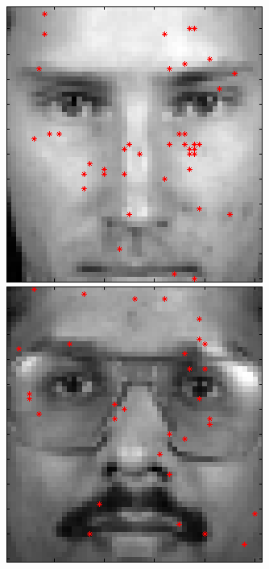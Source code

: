 \begin{figure}[ht]
 \includegraphics[width=\textwidth*11/100]{ch5/figures/XM2VTS_2_-1.png}
 \includegraphics[width=\textwidth*11/100]{ch5/figures/XM2VTS_3_-1.png}

\end{figure}
